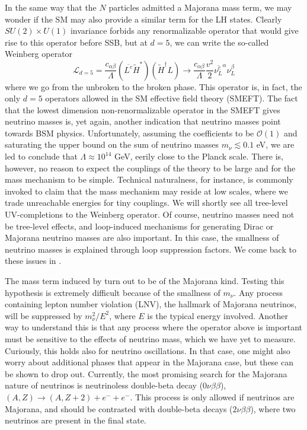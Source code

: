 In the same way that the $N$ particles admitted a Majorana mass term, we may wonder if the SM may also provide a similar term for the LH states. Clearly $SU(2) \times U(1)$ invariance forbids any renormalizable operator that would give rise to this operator before SSB, but at $d=5$, we can write the so-called Weinberg operator
%
\begin{equation}\label{eq:weinberg}
 \mathscr{L}_{d=5} = \frac{c_{\alpha\beta}}{\Lambda} \left( \overline{L^c} \widetilde{H}^* \right) \left( \widetilde{H}^\dagger L  \right) \to  \frac{c_{\alpha\beta}}{\Lambda} \frac{v^2}{2} \overline{\nu_L^c}^\alpha \nu_L^\beta
\end{equation}
%
where we go from the unbroken to the broken phase. This operator is, in fact, the only $d=5$ operators allowed in the SM effective field theory (SMEFT). The fact that the lowest dimension non-renormalizable operator in the SMEFT gives neutrino masses is, yet again, another indication that neutrino masses point towards BSM physics. Unfortunately, assuming the coefficients to be $\mathcal{O}(1)$ and saturating the upper bound on the sum of neutrino masses $m_\nu \lesssim 0.1 $ eV, we are led to conclude that $\Lambda \approx 10^{14}$ GeV, eerily close to the Planck scale. There is, however, no reason to expect the couplings of the theory to be large and for the mass mechanism to be simple. Technical naturalness, for instance, is commonly invoked to claim that the mass mechanism may reside at low scales, where we trade unreachable energies for tiny couplings. We will shortly see all tree-level UV-completions to the Weinberg operator. Of course, neutrino masses need not be tree-level effects, and loop-induced mechanisms for generating Dirac or Majorana neutrino masses are also important. In this case, the smallness of neutrino masses is explained through loop suppression factors. We come back to these issues in .


The mass term induced by  turn out to be of the Majorana kind. Testing this hypothesis is extremely difficult because of the smallness of $m_\nu$. Any process containing lepton number violation (LNV), the hallmark of Majorana neutrinos, will be suppressed by $m_\nu^2/E^2$, where $E$ is the typical energy involved. Another way to understand this is that any process where the operator above is important must be sensitive to the effects of neutrino mass, which we have yet to measure. Curiously, this holds also for neutrino oscillations. In that case, one might also worry about additional phases that appear in the Majorana case, but these can be shown to drop out. Currently, the most promising search for the Majorana nature of neutrinos is neutrinoless double-beta decay ($0\nu\beta\beta$), $(A,Z)\to(A,Z+2) + e^- + e^-$. This process is only allowed if neutrinos are Majorana, and should be contrasted with double-beta decays ($2\nu\beta\beta$), where two neutrinos are present in the final state.  



